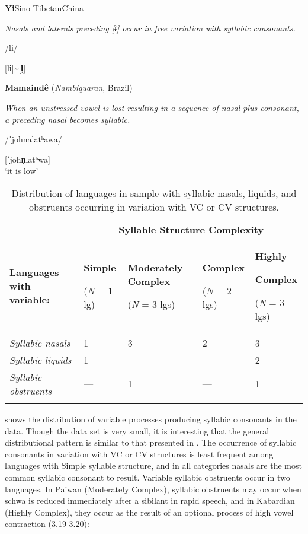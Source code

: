 \ea\label{ex:3.17}
 \textbf{Yi}{Sino-Tibetan}{China}

\textit{Nasals and laterals preceding [ɨ] occur in free variation with syllabic consonants.}

/lɨ/

[lɨ]{\textasciitilde}[\textbf{l̩}]
\citep[31]{Gerner2013}
\z

\ea\label{ex:3.18}
   \textbf{Mamaindê} (\textit{Nambiquaran}, Brazil)

\textit{When an unstressed vowel is lost resulting in a sequence of nasal plus consonant, a preceding nasal becomes syllabic.}

/ˈjohnalatʰawa/

[ˈjoh\textbf{n̩}latʰwa]\\
\glt ‘it is low’
\citep[262-3]{Eberhard2009}
\z

\begin{table}
\begin{tabularx}{\textwidth}{XXXXX}
 & \multicolumn{4}{c}{ \textbf{Syllable Structure Complexity}}\\
\lsptoprule
 \textbf{Languages with variable:} & { \textbf{Simple}}

 (\textit{N} = 1 lg) & { \textbf{Moderately Complex}}

 (\textit{N} = 3 lgs) & { \textbf{Complex}}

 (\textit{N} = 2 lgs) & { \textbf{Highly} }

{ \textbf{Complex}}

 (\textit{N} = 3 lgs)\\
 \textit{Syllabic nasals} & 1 & 3 & 2 & 3\\
 \textit{Syllabic liquids} & 1 & — & — & 2\\
 \textit{Syllabic obstruents} & — & 1 & — & 1\\
\lspbottomrule
\end{tabularx}
\caption{\label{tab:3.7}Distribution of languages in sample with syllabic nasals, liquids, and obstruents occurring in variation with VC or CV structures.}
\end{table}

   shows the distribution of variable processes producing syllabic consonants in the data. Though the data set is very small, it is interesting that the general distributional pattern is similar to that presented in . The occurrence of syllabic consonants in variation with VC or CV structures is least frequent among languages with Simple syllable structure, and in all categories nasals are the most common syllabic consonant to result. Variable syllabic obstruents occur in two languages. In Paiwan (Moderately Complex), syllabic obstruents may occur when schwa is reduced immediately after a sibilant in rapid speech, and in Kabardian (Highly Complex), they occur as the result of an optional process of high vowel contraction (3.19-3.20):

